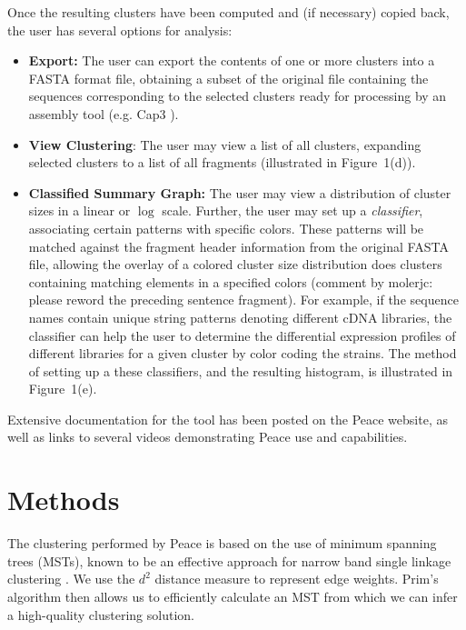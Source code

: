 \documentclass[a4,center,fleqn]{NAR}
\begin{document}
 Once the resulting clusters have been
computed and (if necessary) copied back, the user has several options
for analysis:
\begin{itemize}
\item {\bf Export:} The user can export the contents of one or more
  clusters into a FASTA format file, obtaining a subset of the original file
  containing the sequences corresponding to the selected clusters
  ready for processing by an assembly tool (e.g. {\sc Cap3} \cite{Huang99}).
\item {\bf View Clustering}: The user may view a list of all clusters,
  expanding selected clusters to a list of all fragments (illustrated in
  Figure~1(d)).  
\item {\bf Classified Summary Graph:} The user may view a distribution
  of cluster sizes in a linear or $\log$ scale.  Further, the user may
  set up a {\it classifier}, associating certain patterns with
  specific colors.  These patterns will be matched against the
  fragment header information from the original FASTA file, allowing
  the overlay of a colored cluster size distribution does clusters
  containing matching elements in a specified colors (comment by molerjc: please reword the preceding sentence fragment).  For example, if
  the sequence names contain unique string patterns denoting different
  cDNA libraries, the classifier can help the user to determine the
  differential expression profiles of different libraries for a given
  cluster by color coding the strains.  The method of setting up a
  these classifiers, and the resulting histogram, is illustrated in
  Figure~1(e).
\end{itemize}

Extensive documentation for the tool has been posted on the {\sc
  Peace} website, as well as links to several videos demonstrating
{\sc Peace} use and capabilities.


\section{Methods}

The clustering performed by {\sc Peace} is based on the use of minimum
spanning trees (MSTs), known to be an effective approach for narrow
band single linkage clustering \cite{Jain99,Wan08}. We use the $d^2$
distance measure \cite{Hide94} to represent edge weights.  Prim's
algorithm \cite{Prim57} then allows us to efficiently calculate an
MST from which we can infer a high-quality clustering solution.
\end{document}
